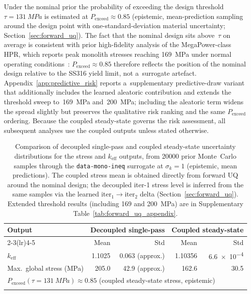 \documentclass[pdflatex,sn-mathphys-num]{sn-jnl}
\theoremstyle{thmstyleone}
\theoremstyle{thmstyletwo}
\theoremstyle{thmstylethree}
\begin{document}
Under the nominal prior the probability of exceeding the design threshold
$\tau = \SI{131}{MPa}$ is estimated at $P_{\mathrm{exceed}} \approx 0.85$
(epistemic, mean-prediction sampling around the design point with one-standard-deviation
material uncertainty; Section~\ref{sec:forward_uq}).
The fact that the nominal design sits above~$\tau$ on average is consistent with
prior high-fidelity analysis of the MegaPower-class HPR, which reports peak
monolith stresses reaching \SI{169}{MPa} under normal operating
conditions~\cite{ref:zhang2025energy}: $P_{\mathrm{exceed}} \approx 0.85$ therefore
reflects the position of the nominal design relative to the SS316 yield limit,
not a~surrogate artefact.
Appendix~\ref{app:predictive_risk} reports a~supplementary predictive-draw
variant that additionally includes the learned aleatoric contribution and extends
the threshold sweep to~\SI{169}{MPa} and~\SI{200}{MPa}; including the aleatoric
term widens the spread slightly but preserves the qualitative risk ranking and
the same $P_{\mathrm{exceed}}$ ordering.
Because the coupled steady-state governs the risk assessment, all subsequent
analyses use the coupled outputs unless stated otherwise.

\begin{table}[ht]
\caption{%
  Comparison of decoupled single-pass and coupled steady-state uncertainty
  distributions for the stress and $k_{\mathrm{eff}}$ outputs, from \num{20000} prior
  Monte~Carlo samples through the \texttt{data-mono-ineq} surrogate at $\sigma_{k}=1$
  (epistemic, mean predictions).
  The coupled stress mean is obtained directly from forward UQ around the nominal
  design; the decoupled iter-1 stress level is inferred from the same samples via
  the learned $\text{iter}_1\!\to\!\text{iter}_2$ delta (Section~\ref{sec:forward_uq}).
  Extended threshold results (including \SI{169}{} and \SI{200}{MPa}) are in
  Supplementary Table~\ref{tab:forward_uq_appendix}.
}\label{tab:forward_uq}
\begin{tabular*}{\textwidth}{@{\extracolsep\fill}lrrrr@{}}
\toprule
Output & \multicolumn{2}{c}{Decoupled single-pass} & \multicolumn{2}{c}{Coupled steady-state} \\
\cmidrule(lr){2-3}\cmidrule(lr){4-5}
       & Mean & Std & Mean & Std \\
\midrule
$k_{\mathrm{eff}}$              & 1.1025 & 0.063 (approx.) & 1.10356 & \num{6.6e-4} \\
Max.\ global stress (MPa)       & 205.0  & 42.9 (approx.)  & 162.6   & 30.5 \\
\midrule
\multicolumn{5}{l}{$P_{\mathrm{exceed}}(\tau = \SI{131}{MPa}) \approx 0.85$
                   (coupled steady-state stress, epistemic)} \\
\botrule
\end{tabular*}
\end{table}
\end{document}
